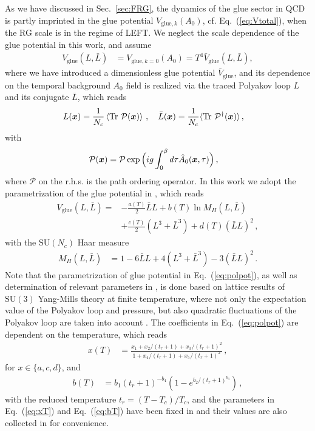 \documentclass[%
reprint,
superscriptaddress,
showpacs,preprintnumbers,
amsmath,amssymb,
aps,
prd,
]{revtex4-1}
\newcommand{\Tr}{\ensuremath{\operatorname{Tr}}}
\def\Eq#1{Eq.~(\ref{#1})}
\def\sec#1{Sec.~\ref{#1}}
\begin{document}
	As we have discussed in \sec{sec:FRG}, the dynamics of the glue sector in QCD is partly imprinted in the glue potential $V_{\mathrm{glue},k}(A_0)$, cf. \Eq{eq:Vtotal}, when the RG scale is in the regime of LEFT. We neglect the scale dependence of the glue potential in this work, and assume
	\begin{align}
		V_\mathrm{glue}(L,\bar{L})&=V_{\mathrm{glue},k=0}(A_0)=T^4 \bar V_\mathrm{glue}(L,\bar{L}),\label{}
	\end{align}
	where we have introduced a dimensionless glue potential $\bar V_\mathrm{glue}$, and its dependence on the temporal background $A_0$ field is realized via the traced Polyakov loop $L$ and its conjugate $\bar{L}$, which reads
	\begin{align}
		L(\bm{x})&=\frac{1}{N_c} \left\langle \Tr\, {\cal P}(\bm x)\right\rangle\,,\quad  \bar L (\bm{x})=\frac{1}{N_c} \langle \Tr\,{\cal P}^{\dagger}(\bm x)\rangle \,,\label{eq:Lloop}
	\end{align}
	with 
	\begin{align}
		{\cal P}(\bm x)&=\mathcal{P}\exp\Big(ig\int_0^{\beta}d\tau \hat A_0(\bm{x},\tau)\Big)\,, \label{eq:Ploop}
	\end{align}
	where $\mathcal{P}$ on the r.h.s. is the path ordering operator. In this work we adopt the parametrization of the glue potential in \cite{Lo:2013hla}, which reads
	\begin{align}
		V_\text{glue}(L,\bar{L})=& -\frac{a(T)}{2} \bar L L + b(T)\ln M_H(L,\bar{L})\nonumber \\[2ex]
		&+ \frac{c(T)}{2} (L^3+\bar L^3) + d(T) (\bar{L} L)^2\,,
		\label{eq:polpot}
	\end{align}
	with the $\mathrm{SU}(N_c)$ Haar measure
	\begin{align}
		M_H (L, \bar{L})&= 1 -6 \bar{L}L + 4 (L^3+\bar{L}^3) - 3  (\bar{L}L)^2\,.
	\end{align}
	Note that the parametrization of glue potential in \Eq{eq:polpot}, as well as determination of relevant parameters in , is done based on lattice results of  $\mathrm{SU}(3)$ Yang-Mills theory at finite temperature, where not only the expectation value of the Polyakov loop and pressure, but also quadratic fluctuations of the Polyakov loop are taken into account \cite{Lo:2013hla}. The coefficients in \Eq{eq:polpot} are dependent on the temperature, which reads
	\begin{align}
		x(T) &= \frac{x_1 + x_2/(t_r+1) + x_3/(t_r+1)^2}{1 + x_4/(t_r+1) + x_5/(t_r+1)^2}\,,\label{eq:xT}
	\end{align}
	for $x\in \{a, c, d\}$, and 
	\begin{align}
		b(T) &=b_1 (t_r+1)^{-b_4}\left (1 -e^{b_2/(t_r+1)^{b_3}} \right)\,,\label{eq:bT}
	\end{align}
	with the reduced temperature $t_r=(T-T_c)/T_c$, and the parameters in \Eq{eq:xT} and \Eq{eq:bT} have been fixed in \cite{Lo:2013hla} and their values are also collected in  for convenience.
	
\end{document}
